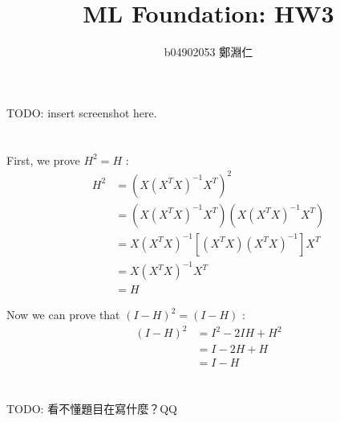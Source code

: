 \documentclass[12pt,a4paper]{article}
\title{ML Foundation: HW3}
\author{b04902053 鄭淵仁}
\begin{document}
\maketitle
\section{} %

TODO: insert screenshot here.

\section{} %

First, we prove ${H}^{2} = H$ :
\[
	\begin{aligned}
		{H}^{2} &= {(X {({X}^{T}X)}^{-1} {X}^{T})} ^ {2} \\
				&= (X {({X}^{T}X)}^{-1} {X}^{T}) (X {({X}^{T}X)}^{-1} {X}^{T}) \\
				&= X {({X}^{T}X)}^{-1} [ ({X}^{T} X) {({X}^{T}X)}^{-1} ] {X}^{T} \\
				&= X {({X}^{T}X)}^{-1} {X}^{T} \\
				&= H
	\end{aligned}
\]

Now we can prove that ${(I-H)}^{2} = (I-H)$ :
\[
	\begin{aligned}
		{(I-H)}^{2} &= {I}^{2} - 2IH + {H}^{2} \\
					&= I - 2H + H \\
					&= I - H
	\end{aligned}
\]

\section{} %

TODO: 看不懂題目在寫什麼？QQ

\section{} %
\end{document}
